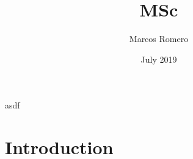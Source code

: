 \documentclass{article}
\title{MSc}
\author{Marcos Romero}
\date{July 2019}
\begin{document}
asdf

\maketitle

\section{Introduction}
\end{document}
